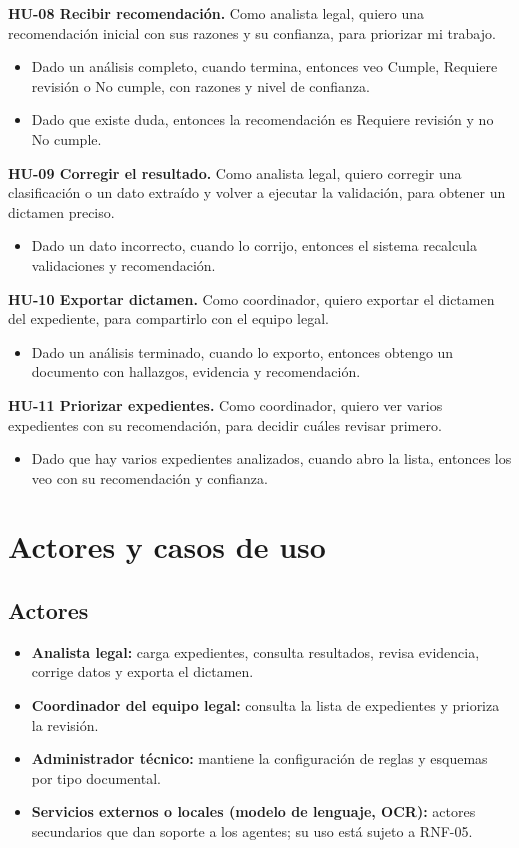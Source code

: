 \documentclass[11pt, a4paper]{article}
\begin{document}
\textbf{HU-08 Recibir recomendación.} Como analista legal, quiero una recomendación inicial con sus razones y su confianza, para priorizar mi trabajo.
\begin{itemize}
    \item Dado un análisis completo, cuando termina, entonces veo Cumple, Requiere revisión o No cumple, con razones y nivel de confianza.
    \item Dado que existe duda, entonces la recomendación es Requiere revisión y no No cumple.
\end{itemize}

\textbf{HU-09 Corregir el resultado.} Como analista legal, quiero corregir una clasificación o un dato extraído y volver a ejecutar la validación, para obtener un dictamen preciso.
\begin{itemize}
    \item Dado un dato incorrecto, cuando lo corrijo, entonces el sistema recalcula validaciones y recomendación.
\end{itemize}

\textbf{HU-10 Exportar dictamen.} Como coordinador, quiero exportar el dictamen del expediente, para compartirlo con el equipo legal.
\begin{itemize}
    \item Dado un análisis terminado, cuando lo exporto, entonces obtengo un documento con hallazgos, evidencia y recomendación.
\end{itemize}

\textbf{HU-11 Priorizar expedientes.} Como coordinador, quiero ver varios expedientes con su recomendación, para decidir cuáles revisar primero.
\begin{itemize}
    \item Dado que hay varios expedientes analizados, cuando abro la lista, entonces los veo con su recomendación y confianza.
\end{itemize}

\section{Actores y casos de uso}

\subsection*{Actores}
\begin{itemize}
    \item \textbf{Analista legal:} carga expedientes, consulta resultados, revisa evidencia, corrige datos y exporta el dictamen.
    \item \textbf{Coordinador del equipo legal:} consulta la lista de expedientes y prioriza la revisión.
    \item \textbf{Administrador técnico:} mantiene la configuración de reglas y esquemas por tipo documental.
    \item \textbf{Servicios externos o locales (modelo de lenguaje, OCR):} actores secundarios que dan soporte a los agentes; su uso está sujeto a RNF-05.
\end{itemize}
\end{document}
